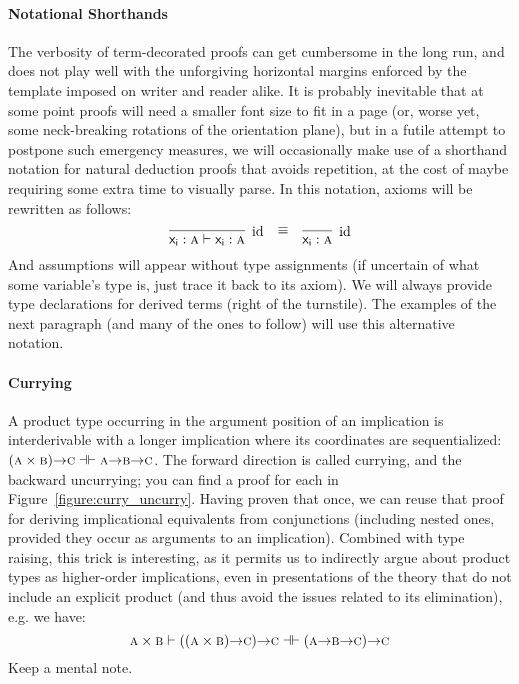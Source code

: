 \paragraph{Notational Shorthands}
The verbosity of term-decorated proofs can get cumbersome in the long run, and does not play well with the unforgiving horizontal margins enforced by the template imposed on writer and reader alike.
It is probably inevitable that at some point proofs will need a smaller font size to fit in a page (or, worse yet, some neck-breaking rotations of the orientation plane), but in a futile attempt to postpone such emergency measures, we will occasionally make use of a shorthand notation for natural deduction proofs that avoids repetition, at the cost of maybe requiring some extra time to visually parse.
In this notation, axioms will be rewritten as follows:
\[
\infer[\Ax]{\term{x_i }: \prop{A} \vdash \term{x_i }: \prop{A}}{} \quad \raisebox{7pt}{$\equiv$} \quad \infer[\Ax]{\term{x_i }:\prop{A}}{}
\]
And assumptions will appear without type assignments (if uncertain of what some variable's type is, just trace it back to its axiom). 
We will always provide type declarations for derived terms (right of the turnstile).
The examples of the next paragraph (and many of the ones to follow) will use this alternative notation.

\paragraph{Currying}
A product type occurring in the argument position of an implication is interderivable with a longer implication where its coordinates are sequentialized: $(\smallprop{A}\times\smallprop{B}) \ii \smallprop{C} \dashv \vdash \smallprop{A} \ii \smallprop{B} \ii \smallprop{C}$.
The forward direction is called currying, and the backward uncurrying; you can find a proof for each in Figure~\ref{figure:curry_uncurry}.
Having proven that once, we can reuse that proof for deriving implicational equivalents from conjunctions (including nested ones, provided they occur as arguments to an implication).
Combined with type raising, this trick is interesting, as it permits us to indirectly argue about product types as higher-order implications, even in presentations of the theory that do not include an explicit product (and thus avoid the issues related to its elimination), e.g. we have:
\[
	\prop{A} \times \prop{B} \vdash ((\prop{A} \times \prop{B}) \ii \prop{C}) \ii \prop{C} \dashv \vdash (\prop{A} \ii \prop{B} \ii \prop{C}) \ii \prop{C}
\]
Keep a mental note.

